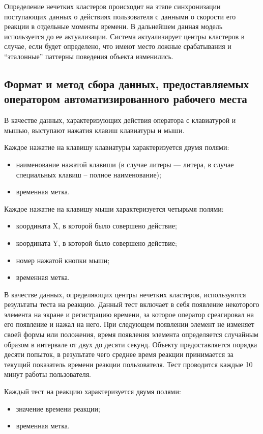 Определение нечетких кластеров происходит на этапе синхронизации поступающих данных о действиях пользователя с данными о скорости его реакции в отдельные моменты времени. В дальнейшем данная модель используется до ее актуализации. Система актуализирует центры кластеров в случае, если будет определено, что имеют место ложные срабатывания и ``эталонные'' паттерны поведения объекта изменились.

\subsection{Формат и метод сбора данных, предоставляемых оператором автоматизированного рабочего места}
В качестве данных, характеризующих действия оператора с клавиатурой и мышью, выступают нажатия клавиш клавиатуры и мыши.

Каждое нажатие на клавишу клавиатуры характеризуется двумя полями:
\begin{itemize}[leftmargin=1.6\parindent]
\item наименование нажатой клавиши (в случае литеры --- литера, в случае специальных клавиш -- полное наименование);
\item временная метка.
\end{itemize}

Каждое нажатие на клавишу мыши характеризуется четырьмя полями:
\begin{itemize}[leftmargin=1.6\parindent]
\item координата X, в которой было совершено действие;
\item координата Y, в которой было совершено действие;
\item номер нажатой кнопки мыши;
\item временная метка.
\end{itemize}

В качестве данных, определяющих центры нечетких кластеров, используются результаты теста на реакцию. Данный тест включает в себя появление некоторого элемента на экране и регистрацию времени, за которое оператор среагировал на его появление и нажал на него. При следующем появлении элемент не изменяет своей формы или положения, время появления элемента определяется случайным образом в интервале от двух до десяти секунд. Объекту предоставляется порядка десяти попыток, в результате чего среднее время реакции принимается за текущий показатель времени реакции пользователя. Тест проводится каждые 10 минут работы пользователя.

Каждый тест на реакцию характеризуется двумя полями:
\begin{itemize}[leftmargin=1.6\parindent]
\item значение времени реакции;
\item временная метка.
\end{itemize}


